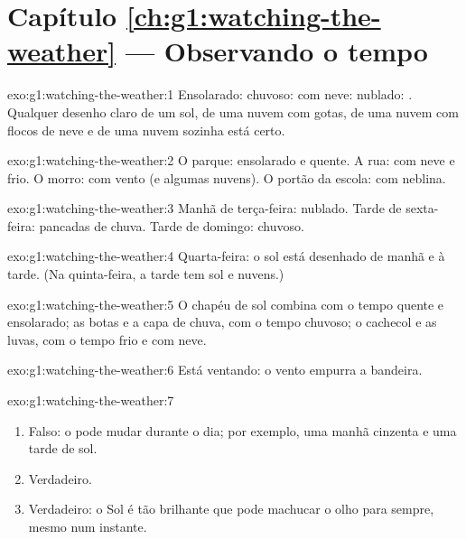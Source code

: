 \section*{Capítulo \ref{ch:g1:watching-the-weather} --- Observando o tempo}

\begin{solution}{exo:g1:watching-the-weather:1}
Ensolarado: \quad chuvoso: \quad com neve: \quad
nublado: . Qualquer desenho claro de um sol, de uma nuvem com
gotas, de uma nuvem com flocos de neve e de uma nuvem sozinha está certo.
\end{solution}

\begin{solution}{exo:g1:watching-the-weather:2}
O parque: ensolarado e quente. A rua: com neve e frio. O morro: com vento
(e algumas nuvens). O portão da escola: com neblina.
\end{solution}

\begin{solution}{exo:g1:watching-the-weather:3}
Manhã de terça-feira: nublado. Tarde de sexta-feira: pancadas de chuva.
Tarde de domingo: chuvoso.
\end{solution}

\begin{solution}{exo:g1:watching-the-weather:4}
Quarta-feira: o sol está desenhado de manhã e à tarde.
(Na quinta-feira, a tarde tem sol e nuvens.)
\end{solution}

\begin{solution}{exo:g1:watching-the-weather:5}
O chapéu de sol combina com o tempo quente e ensolarado; as botas e a
capa de chuva, com o tempo chuvoso; o cachecol e as luvas, com o tempo
frio e com neve.
\end{solution}

\begin{solution}{exo:g1:watching-the-weather:6}
Está ventando: o vento empurra a bandeira.
\end{solution}

\begin{solution}{exo:g1:watching-the-weather:7}
\begin{enumerate}
  \item Falso: o  pode mudar durante o dia; por exemplo, uma manhã
        cinzenta e uma tarde de sol.
  \item Verdadeiro.
  \item Verdadeiro: o Sol é tão brilhante que pode machucar o olho para
        sempre, mesmo num instante.
\end{enumerate}
\end{solution}

